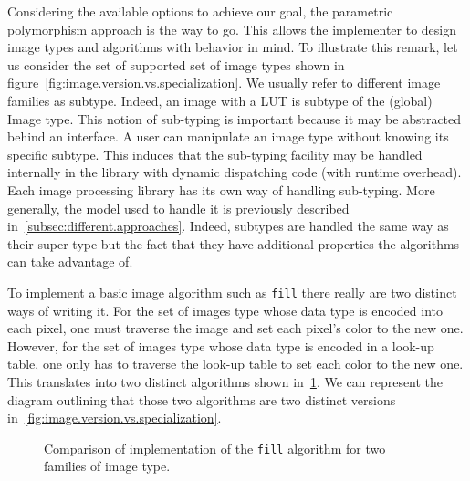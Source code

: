 Considering the available options to achieve our goal, the parametric polymorphism approach is the way to go. This
allows the implementer to design image types and algorithms with behavior in mind. To illustrate this remark, let us
consider the set of supported set of image types shown in figure~\ref{fig:image.version.vs.specialization}. We usually
refer to different image families as subtype. Indeed, an image with a LUT is subtype of the (global) Image type. This
notion of sub-typing is important because it may be abstracted behind an interface. A user can manipulate an image type
without knowing its specific subtype. This induces that the sub-typing facility may be handled internally in the library
with dynamic dispatching code (with runtime overhead). Each image processing library has its own way of handling
sub-typing. More generally, the model used to handle it is previously described in~\cref{subsec:different.approaches}.
Indeed, subtypes are handled the same way as their super-type but the fact that they have additional properties the
algorithms can take advantage of.


To implement a basic image algorithm such as \texttt{fill} there really are two distinct ways of writing it. For the set
of images type whose data type is encoded into each pixel, one must traverse the image and set each pixel's color to the
new one. However, for the set of images type whose data type is encoded in a look-up table, one only has to traverse the
look-up table to set each color to the new one. This translates into two distinct algorithms shown
in~\cref{fig:traverse.vs.LUT}. We can represent the diagram outlining that those two algorithms are two distinct
versions in~\cref{fig:image.version.vs.specialization}.

\begin{figure}[htbp]
  \centering
  \hfil

  \caption{Comparison of implementation of the \texttt{fill} algorithm for two
    families of image type.}
  \label{fig:traverse.vs.LUT}
\end{figure}

